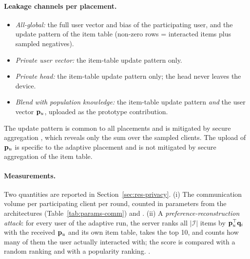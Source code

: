 \paragraph{Leakage channels per placement.}
\begin{itemize}[leftmargin=2em]
  \item \emph{All-global:} the full user vector and bias of the participating user, and the
        update pattern of the item table (non-zero rows = interacted items plus sampled
        negatives).
  \item \emph{Private user vector:} the item-table update pattern only.
  \item \emph{Private head:} the item-table update pattern only; the head never leaves the device.
  \item \emph{Blend with population knowledge:} the item-table update pattern \emph{and} the
        user vector $\mathbf{p}_u$, uploaded as the prototype contribution.
\end{itemize}
The update pattern is common to all placements and is mitigated by secure aggregation
\cite{bonawitz2017secagg}, which reveals only the sum over the sampled clients. The upload of
$\mathbf{p}_u$ is specific to the adaptive placement and is not mitigated by secure aggregation of the
item table.

\paragraph{Measurements.} Two quantities are reported in Section~\ref{sec:res-privacy}.
(i) The communication volume per participating client per round, counted in parameters from
the architectures (Table~\ref{tab:params-comm}) and . (ii) A \emph{preference-reconstruction attack}: for every user of the adaptive
run, the server ranks all $|\mathcal{I}|$ items by $\mathbf{p}_u^\top \mathbf{q}_i$ with the received $\mathbf{p}_u$ and
its own item table, takes the top 10, and counts how many of them the user actually interacted
with; the score is compared with a random ranking and with a popularity ranking.
.
